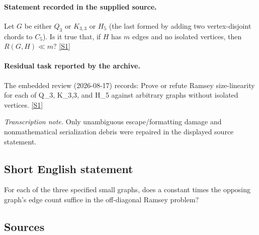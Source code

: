 \documentclass[11pt,a4paper]{article}
\newcommand{\sref}[2]{\hyperlink{source:#1:#2}{[S#2]}}
\begin{document}
\paragraph{Statement recorded in the supplied source.}
Let $G$ be either $Q_3$ or $K_{3,3}$ or $H_5$ (the last formed by adding two vertex-disjoint chords to $C_5$). Is it true that, if $H$ has $m$ edges and no isolated vertices, then $ R(G,H)\ll m? $ \sref{statement}{1}

\paragraph{Residual task reported by the archive.}

The embedded review (2026-08-17) records: Prove or refute Ramsey size-linearity for each of Q\_3, K\_{3,3}, and H\_5 against arbitrary graphs without isolated vertices. \sref{statement}{1}

{\small\emph{Transcription note.} Only unambiguous escape/formatting damage and nonmathematical serialization debris were repaired in the displayed source statement.}

\subsection{Short English statement}

For each of the three specified small graphs, does a constant times the opposing graph's edge count suffice in the off-diagonal Ramsey problem?

\subsection{Sources}
\end{document}
